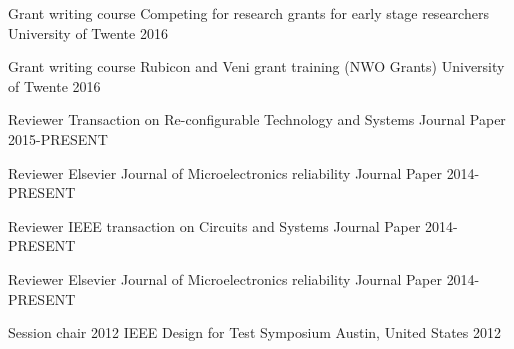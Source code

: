 

\begin{cvhonors}


  \cvhonor
    {Grant writing course} %
    {Competing for research grants for early stage researchers} %
    {University of Twente} %
    {2016} %


  \cvhonor
    {Grant writing course} %
    {Rubicon and Veni grant training (NWO Grants)} %
    {University of Twente} %
    {2016} %


  \cvhonor
    {Reviewer} %
    {Transaction on Re-configurable Technology and Systems} %
    {Journal Paper} %
    {2015-PRESENT} %


  \cvhonor
    {Reviewer} %
    {Elsevier Journal of Microelectronics reliability} %
    {Journal Paper} %
    {2014-PRESENT} %

  \cvhonor
    {Reviewer} %
    {IEEE transaction on Circuits and Systems} %
    {Journal Paper} %
    {2014-PRESENT} %

  \cvhonor
    {Reviewer} %
    {Elsevier Journal of Microelectronics reliability} %
    {Journal Paper} %
    {2014-PRESENT} %

  \cvhonor
    {Session chair} %
    {2012 IEEE Design for Test Symposium} %
    {Austin, United States} %
    {2012} %

\end{cvhonors}
